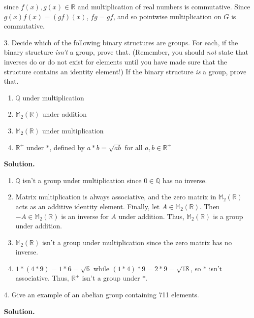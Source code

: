 \documentclass[10pt,]{book}
\theoremstyle{plain}
\theoremstyle{definition}
\theoremstyle{definition}
\theoremstyle{definition}
\theoremstyle{definition}
\numberwithin{equation}{section}
\def\R{\mathbb{R}}
\def\Q{\mathbb{Q}}
\def\M{\mathbb{M}}
\begin{document}
\begin{exerciselist}
      since \(f(x), g(x)\in \R\) and multiplication of real numbers is commutative. Since \(g(x)f(x)=(gf)(x)\),
      \(fg=gf\), and so pointwise multiplication on \(G\) is commutative.
\item[3.]\hypertarget{exercise-14}{}
        Decide which of the following binary structures are groups. For each, if the binary structure \emph{isn't} a group, prove that. (Remember, you should \emph{not} state that inverses do or do not exist for elements until you have made sure that the structure contains an identity element!) If the binary structure \emph{is} a group, prove that.
        \leavevmode%
\begin{enumerate}[label=(\alph*)]
\item\hypertarget{li-111}{}
              \(\Q\) under multiplication
\item\hypertarget{li-112}{}
              \(\M_2(\R)\) under addition
\item\hypertarget{li-113}{}
              \(\M_2(\R)\) under multiplication
\item\hypertarget{li-114}{}
              \(\R^+\) under \(*\), defined by \(a*b=\sqrt{ab}\) for all \(a,b\in \R^+\)
\end{enumerate}

\par\smallskip
\par\smallskip
\noindent\textbf{Solution.}\hypertarget{solution-14}{}\quad
\leavevmode%
\begin{enumerate}[label=(\alph*)]
\item\hypertarget{li-115}{}
        \(\Q\) isn't a group under multiplication since \(0\in \Q\) has no inverse.
\item\hypertarget{li-116}{}Matrix multiplication is always associative, and the zero matrix in \(\M_2(\R)\) acts as an additive identity element.            Finally, let \(A\in \M_2(\R)\).  Then \(-A\in \M_2(\R)\) is an inverse for \(A\) under addition. Thus, \(\M_2(\R)\) is a group under addition.%
\item\hypertarget{li-117}{}
        \(\M_2(\R)\) isn't a group under multiplication since the zero matrix has no inverse.
\item\hypertarget{li-118}{}
        \(1*(4*9)=1*6=\sqrt{6}\) while \((1*4)*9=2*9=\sqrt{18}\), so \(*\) isn't associative.  Thus, \(\R^+\) isn't a group under \(*\).
\end{enumerate}
\item[4.]\hypertarget{exercise-15}{}
        Give an example of an abelian group containing 711 elements.
\par\smallskip
\par\smallskip
\noindent\textbf{Solution.}\hypertarget{solution-15}{}\quad


\end{exerciselist}
\end{document}
